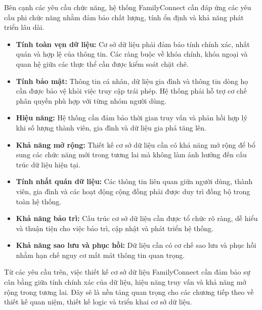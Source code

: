 Bên cạnh các yêu cầu chức năng, hệ thống FamilyConnect cần đáp ứng các yêu cầu phi chức năng nhằm đảm bảo chất lượng, tính ổn định và khả năng phát triển lâu dài.

\begin{itemize}[leftmargin=*]
\item \textbf{Tính toàn vẹn dữ liệu:} Cơ sở dữ liệu phải đảm bảo tính chính xác, nhất quán và hợp lệ của thông tin. Các ràng buộc về khóa chính, khóa ngoại và quan hệ giữa các thực thể cần được kiểm soát chặt chẽ.
\item \textbf{Tính bảo mật:} Thông tin cá nhân, dữ liệu gia đình và thông tin dòng họ cần được bảo vệ khỏi việc truy cập trái phép. Hệ thống phải hỗ trợ cơ chế phân quyền phù hợp với từng nhóm người dùng.
\item \textbf{Hiệu năng:} Hệ thống cần đảm bảo thời gian truy vấn và phản hồi hợp lý khi số lượng thành viên, gia đình và dữ liệu gia phả tăng lên.
\item \textbf{Khả năng mở rộng:} Thiết kế cơ sở dữ liệu cần có khả năng mở rộng để bổ sung các chức năng mới trong tương lai mà không làm ảnh hưởng đến cấu trúc dữ liệu hiện tại.
\item \textbf{Tính nhất quán dữ liệu:} Các thông tin liên quan giữa người dùng, thành viên, gia đình và các hoạt động cộng đồng phải được duy trì đồng bộ trong toàn hệ thống.
\item \textbf{Khả năng bảo trì:} Cấu trúc cơ sở dữ liệu cần được tổ chức rõ ràng, dễ hiểu và thuận tiện cho việc bảo trì, cập nhật và phát triển hệ thống.
\item \textbf{Khả năng sao lưu và phục hồi:} Dữ liệu cần có cơ chế sao lưu và phục hồi nhằm hạn chế nguy cơ mất mát thông tin quan trọng.
\end{itemize}

Từ các yêu cầu trên, việc thiết kế cơ sở dữ liệu FamilyConnect cần đảm bảo sự cân bằng giữa tính chính xác của dữ liệu, hiệu năng truy vấn và khả năng mở rộng trong tương lai. Đây sẽ là nền tảng quan trọng cho các chương tiếp theo về thiết kế quan niệm, thiết kế logic và triển khai cơ sở dữ liệu.
